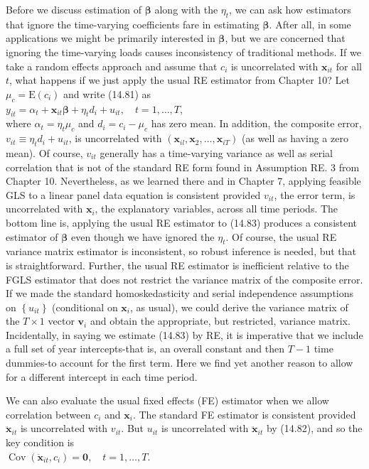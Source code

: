 \documentclass[10pt]{article}
\begin{document}
Before we discuss estimation of $\boldsymbol{\beta}$ along with the $\eta_{t}$, we can ask how estimators that ignore the time-varying coefficients fare in estimating $\boldsymbol{\beta}$. After all, in some applications we might be primarily interested in $\boldsymbol{\beta}$, but we are concerned that ignoring the time-varying loads causes inconsistency of traditional methods. If we take a random effects approach and assume that $c_{i}$ is uncorrelated with $\mathbf{x}_{i t}$ for all $t$, what happens if we just apply the usual RE estimator from Chapter 10? Let $\mu_{c}=\mathrm{E}\left(c_{i}\right)$ and write (14.81) as\\
$y_{i t}=\alpha_{t}+\mathbf{x}_{i t} \boldsymbol{\beta}+\eta_{t} d_{i}+u_{i t}, \quad t=1, \ldots, T$,\\
where $\alpha_{t}=\eta_{t} \mu_{c}$ and $d_{i}=c_{i}-\mu_{c}$ has zero mean. In addition, the composite error, $v_{i t} \equiv \eta_{t} d_{i}+u_{i t}$, is uncorrelated with $\left(\mathbf{x}_{i l}, \mathbf{x}_{2}, \ldots, \mathbf{x}_{i T}\right)$ (as well as having a zero mean). Of course, $v_{i t}$ generally has a time-varying variance as well as serial correlation that is not of the standard RE form found in Assumption RE. 3 from Chapter 10. Nevertheless, as we learned there and in Chapter 7, applying feasible GLS to a linear panel data equation is consistent provided $v_{i t}$, the error term, is uncorrelated with $\mathbf{x}_{i}$, the explanatory variables, across all time periods. The bottom line is, applying the usual RE estimator to (14.83) produces a consistent estimator of $\boldsymbol{\beta}$ even though we have ignored the $\eta_{t}$. Of course, the usual RE variance matrix estimator is inconsistent, so robust inference is needed, but that is straightforward. Further, the usual RE estimator is inefficient relative to the FGLS estimator that does not restrict the variance matrix of the composite error. If we made the standard homoskedasticity and serial independence assumptions on $\left\{u_{i t}\right\}$ (conditional on $\mathbf{x}_{i}$, as usual), we could derive the variance matrix of the $T \times 1$ vector $\mathbf{v}_{i}$ and obtain the appropriate, but restricted, variance matrix. Incidentally, in saying we estimate (14.83) by RE, it is imperative that we include a full set of year intercepts-that is, an overall constant and then $T-1$ time dummies-to account for the first term. Here we find yet another reason to allow for a different intercept in each time period.

We can also evaluate the usual fixed effects (FE) estimator when we allow correlation between $c_{i}$ and $\mathbf{x}_{i}$. The standard FE estimator is consistent provided $\ddot{\mathbf{x}}_{i t}$ is uncorrelated with $v_{i t}$. But $u_{i t}$ is uncorrelated with $\ddot{\mathbf{x}}_{i t}$ by (14.82), and so the key condition is\\
$\operatorname{Cov}\left(\ddot{\mathbf{x}}_{i t}, c_{i}\right)=\mathbf{0}, \quad t=1, \ldots, T$.
\end{document}
